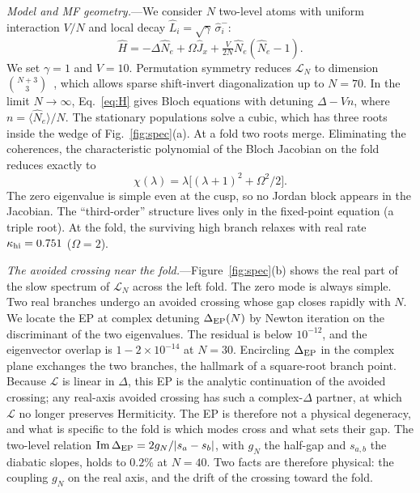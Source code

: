 \documentclass[aps,prl,twocolumn,superscriptaddress,amsmath,amssymb,reprint]{revtex4-2}
\newcommand{\Lc}{\mathcal{L}}
\begin{document}
\emph{Model and MF geometry.}---We consider $N$ two-level atoms with uniform interaction $V/N$ and local decay $\hat L_i=\sqrt\gamma\,\hat\sigma^-_i$:
\begin{equation}
\hat H=-\Delta\hat N_e+\Omega\hat J_x+\tfrac{V}{2N}\hat N_e(\hat N_e-1).
\label{eq:H}
\end{equation}
We set $\gamma=1$ and $V=10$. Permutation symmetry reduces $\Lc_N$ to dimension $\binom{N+3}{3}$~\cite{Shammah2018}, which allows sparse shift-invert diagonalization up to $N=70$. In the limit $N\to\infty$, Eq.~\eqref{eq:H} gives Bloch equations with detuning $\Delta-Vn$, where $n=\langle\hat N_e\rangle/N$. The stationary populations solve a cubic, which has three roots inside the wedge of Fig.~\ref{fig:spec}(a). At a fold two roots merge. Eliminating the coherences, the characteristic polynomial of the Bloch Jacobian on the fold reduces exactly to
\begin{equation}
\chi(\lambda)=\lambda\big[(\lambda+1)^2+\Omega^2/2\big].
\label{eq:jac}
\end{equation}
The zero eigenvalue is simple even at the cusp, so no Jordan block appears in the Jacobian. The ``third-order'' structure lives only in the fixed-point equation (a triple root). At the fold, the surviving high branch relaxes with real rate $\kappa_{\rm hi}=0.751$ ($\Omega=2$).

\emph{The avoided crossing near the fold.}---Figure~\ref{fig:spec}(b) shows the real part of the slow spectrum of $\Lc_N$ across the left fold. The zero mode is always simple. Two real branches undergo an avoided crossing whose gap closes rapidly with $N$. We locate the EP at complex detuning $\Delta_{\rm EP}(N)$ by Newton iteration on the discriminant of the two eigenvalues. The residual is below $10^{-12}$, and the eigenvector overlap is $1-2\times10^{-14}$ at $N=30$. Encircling $\Delta_{\rm EP}$ in the complex plane exchanges the two branches, the hallmark of a square-root branch point. Because $\Lc$ is linear in $\Delta$, this EP is the analytic continuation of the avoided crossing; any real-axis avoided crossing has such a complex-$\Delta$ partner, at which $\Lc$ no longer preserves Hermiticity. The EP is therefore not a physical degeneracy, and what is specific to the fold is which modes cross and what sets their gap. The two-level relation ${\rm Im}\,\Delta_{\rm EP}=2g_N/|s_a-s_b|$, with $g_N$ the half-gap and $s_{a,b}$ the diabatic slopes, holds to $0.2\%$ at $N=40$. Two facts are therefore physical: the coupling $g_N$ on the real axis, and the drift of the crossing toward the fold.
\end{document}
